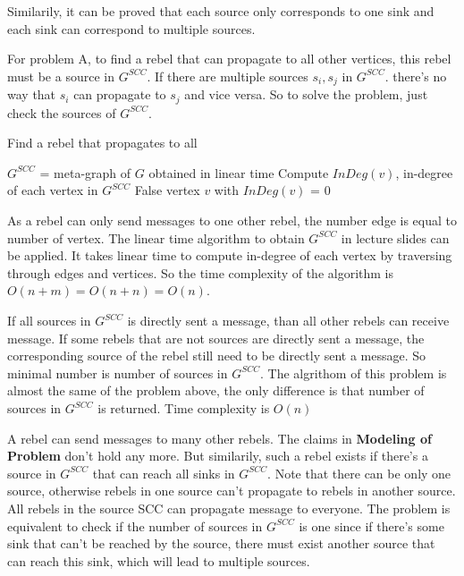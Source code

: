 \documentclass[12pt,a4paper]{article}
\newcommand{\question}[1]{\bigskip\noindent{\textbf{Q{#1} solution}}}
\begin{document}
Similarily, it can be proved that each source only corresponds to one sink and each sink can correspond to multiple sources.

For problem A, to find a rebel that can propagate to all other vertices, this rebel must be a source in $G^{SCC}$. If there are multiple sources $s_i,s_j$ in $G^{SCC}$. there's no way that $s_i$ can propagate to $s_j$ and vice versa. So to solve the problem, just check the sources of $G^{SCC}$.  


\begin{algorithm}
\caption{Find a rebel that propagates to all}\label{alg:q24A}
\begin{algorithmic}
    \State $G^{SCC}$ = meta-graph of $G$ obtained in linear time
    \State Compute $InDeg(v)$, in-degree of each vertex in $G^{SCC}$
      \State \Return False
    \Else
      \State \Return vertex $v$ with $InDeg(v)$ = 0
    \EndIf
  \EndFunction
\end{algorithmic}
\end{algorithm}

As a rebel can only send messages to one other rebel, the number edge is equal to number of vertex. The linear time algorithm to obtain $G^{SCC}$ in lecture slides can be applied. It takes linear time to compute in-degree of each vertex by traversing through edges and vertices. So the time complexity of the algorithm is $O(n + m) = O(n + n) = O(n)$.

\question{24.B}

If all sources in $G^{SCC}$ is directly sent a message, than all other rebels can receive message. If some rebels that are not sources are directly sent a message, the corresponding source of the rebel still need to be directly sent a message. So minimal number is number of sources in $G^{SCC}$. The algrithom of this problem is almost the same of the problem above, the only difference is that number of sources in $G^{SCC}$ is returned. Time complexity is $O(n)$

\question{24.C}

A rebel can send messages to many other rebels. The claims in {\bf Modeling of Problem} don't hold any more. But similarily, such a rebel exists if there's a source in $G^{SCC}$ that can reach all sinks in $G^{SCC}$. Note that there can be only one source, otherwise rebels in one source can't propagate to rebels in another source. All rebels in the source SCC can propagate message to everyone. The problem is equivalent to check if the number of sources in $G^{SCC}$ is one since if there's some sink that can't be reached by the source, there must exist another source that can reach this sink, which will lead to multiple sources.
\end{document}
